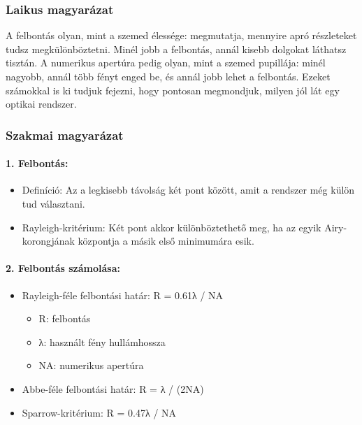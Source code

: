 \documentclass[a4paper,12pt]{article}
\begin{document}
\subsubsection{Laikus magyarázat} A felbontás olyan, mint a szemed élessége: megmutatja, mennyire apró részleteket tudsz megkülönböztetni. Minél jobb a felbontás, annál kisebb dolgokat láthatsz tisztán. A numerikus apertúra pedig olyan, mint a szemed pupillája: minél nagyobb, annál több fényt enged be, és annál jobb lehet a felbontás. Ezeket számokkal is ki tudjuk fejezni, hogy pontosan megmondjuk, milyen jól lát egy optikai rendszer.

\subsubsection{Szakmai magyarázat}

\paragraph{1. Felbontás:} \begin{itemize} \item Definíció: Az a legkisebb távolság két pont között, amit a rendszer még külön tud választani. \item Rayleigh-kritérium: Két pont akkor különböztethető meg, ha az egyik Airy-korongjának központja a másik első minimumára esik. \end{itemize}

\paragraph{2. Felbontás számolása:} \begin{itemize} \item Rayleigh-féle felbontási határ: R = 0.61λ / NA \begin{itemize} \item R: felbontás \item λ: használt fény hullámhossza \item NA: numerikus apertúra \end{itemize} \item Abbe-féle felbontási határ: R = λ / (2NA) \item Sparrow-kritérium: R = 0.47λ / NA \end{itemize}
\end{document}

